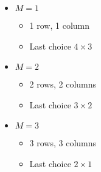 \documentclass[xcolor=dvipsnames,aspectratio=169]{beamer}
\begin{document}
{\begin{columns}
\begin{column}{6cm}
\begin{itemize}
\item $M=1$
\begin{itemize}
\item 1 row, 1 column
\item Last choice $4\times 3$ 
\end{itemize}
\item $M=2$
\begin{itemize}
\item 2 rows, 2 columns
\item Last choice  $3\times 2$
\end{itemize}
\item $M=3$
\begin{itemize}
\item 3 rows, 3 columns 
\item Last choice $2\times 1$
\end{itemize}
\end{itemize}
 
\end{column}
\end{columns}

}
\end{document}
